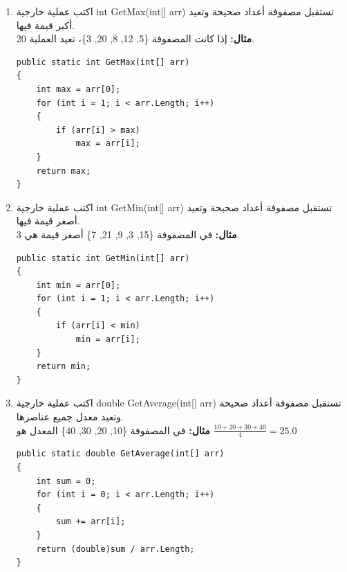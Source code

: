 \documentclass[14pt]{extarticle}
\begin{document}
\begin{enumerate}[resume, itemsep=2em]

    \item
    اكتب عملية خارجية \textenglish{int GetMax(int[] arr)} تستقبل مصفوفة أعداد صحيحة وتعيد أكبر قيمة فيها.\\
    \textbf{مثال:} إذا كانت المصفوفة \textenglish{\{5, 12, 8, 20, 3\}}، تعيد العملية 20.
    \ifwithsols
    \begin{boxSolution}
    \begin{english}
    \begin{verbatim}
public static int GetMax(int[] arr)
{
    int max = arr[0];
    for (int i = 1; i < arr.Length; i++)
    {
        if (arr[i] > max)
            max = arr[i];
    }
    return max;
}
    \end{verbatim}
    \end{english}
    \end{boxSolution}
    \fi

    \item
    اكتب عملية خارجية \textenglish{int GetMin(int[] arr)} تستقبل مصفوفة أعداد صحيحة وتعيد أصغر قيمة فيها.\\
    \textbf{مثال:} في المصفوفة \textenglish{\{15, 3, 9, 21, 7\}} أصغر قيمة هي 3.
    \ifwithsols
    \begin{boxSolution}
    \begin{english}
    \begin{verbatim}
public static int GetMin(int[] arr)
{
    int min = arr[0];
    for (int i = 1; i < arr.Length; i++)
    {
        if (arr[i] < min)
            min = arr[i];
    }
    return min;
}
    \end{verbatim}
    \end{english}
    \end{boxSolution}
    \fi

    \item
    اكتب عملية خارجية \textenglish{double GetAverage(int[] arr)} تستقبل مصفوفة أعداد صحيحة وتعيد معدل جميع عناصرها.\\
    \textbf{مثال:} في المصفوفة \textenglish{\{10, 20, 30, 40\}} المعدل هو $\frac{10+20+30+40}{4} = 25.0$
    \ifwithsols
    \begin{boxSolution}
    \begin{english}
    \begin{verbatim}
public static double GetAverage(int[] arr)
{
    int sum = 0;
    for (int i = 0; i < arr.Length; i++)
    {
        sum += arr[i];
    }
    return (double)sum / arr.Length;
}
    \end{verbatim}
    \end{english}
    \end{boxSolution}
    \fi


\end{enumerate}
\end{document}
